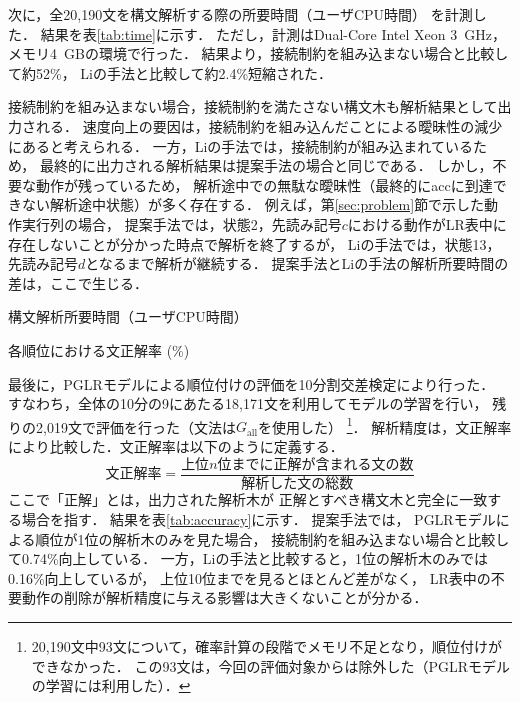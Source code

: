 \documentclass[japanese]{jnlp_1.4}
\begin{document}
次に，全20,190文を構文解析する際の所要時間（ユーザCPU時間） を計測した．
結果を表\ref{tab:time}に示す．
ただし，計測はDual-Core Intel Xeon 3~GHz，メモリ4~GBの環境で行った．
結果より，接続制約を組み込まない場合と比較して約52\%，
Liの手法と比較して約2.4\%短縮された．

接続制約を組み込まない場合，接続制約を満たさない構文木も解析結果として出力される．
速度向上の要因は，接続制約を組み込んだことによる曖昧性の減少にあると考えられる．
一方，Liの手法では，接続制約が組み込まれているため，
最終的に出力される解析結果は提案手法の場合と同じである．
しかし，不要な動作が残っているため，
解析途中での無駄な曖昧性（最終的にaccに到達できない解析途中状態）が多く存在する．
例えば，第\ref{sec:problem}節で示した動作実行列の場合，
提案手法では，状態2，先読み記号$c$における動作がLR表中に存在しないことが分かった時点で解析を終了するが，
Liの手法では，状態13，先読み記号$d$となるまで解析が継続する．
提案手法とLiの手法の解析所要時間の差は，ここで生じる．

\begin{table}[b]
  \caption{構文解析所要時間（ユーザCPU時間）}
  \label{tab:time}

\end{table}
\begin{table}[b]
  \caption{各順位における文正解率 (\%)}
  \label{tab:accuracy}

\end{table}

最後に，PGLRモデルによる順位付けの評価を10分割交差検定により行った．
すなわち，全体の10分の9にあたる18,171文を利用してモデルの学習を行い，
残りの2,019文で評価を行った（文法は$G_{\mbox{all}}$を使用した）
\footnote{20,190文中93文について，確率計算の段階でメモリ不足となり，順位付けができなかった．
  この93文は，今回の評価対象からは除外した（PGLRモデルの学習には利用した）．}．
解析精度は，文正解率により比較した．文正解率は以下のように定義する．
\[
  \mbox{文正解率} = \frac{\mbox{上位$n$位までに正解が含まれる文の数}}{\mbox{解析した文の総数}}
\]
ここで「正解」とは，出力された解析木が
正解とすべき構文木と完全に一致する場合を指す．
結果を表\ref{tab:accuracy}に示す．
提案手法では，
PGLRモデルによる順位が1位の解析木のみを見た場合，
接続制約を組み込まない場合と比較して0.74\%向上している．
一方，Liの手法と比較すると，1位の解析木のみでは0.16\%向上しているが，
上位10位までを見るとほとんど差がなく，
LR表中の不要動作の削除が解析精度に与える影響は大きくないことが分かる．
\end{document}
